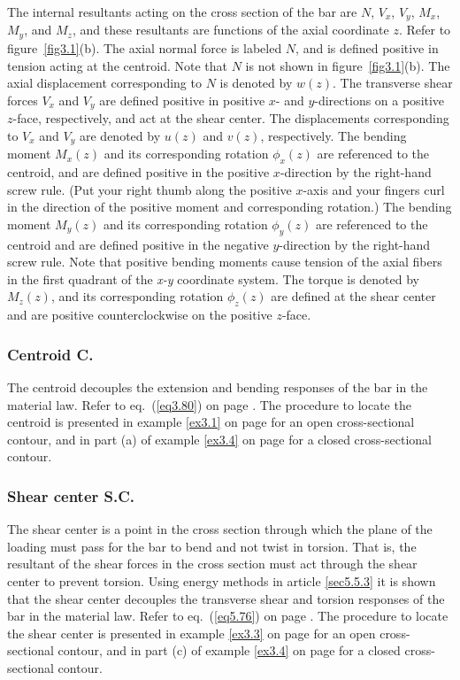 \documentclass{AeroStructure-ERJohnson}
\begin{document}
The internal resultants acting on the cross section of the bar are $N$, $V_{x}$, $V_{y}$, $M_{x}$, $M_{y}$, and $M_{z}$, and these resultants are functions of the axial coordinate $z$. Refer to figure~\ref{fig3.1}(b). The axial normal force is labeled $N$, and is defined positive in tension acting at the centroid. Note that $N$ is not shown in figure~\ref{fig3.1}(b). The axial displacement corresponding to $N$ is denoted by $w(z)$. The transverse shear forces $V_{x}$ and $V_{y}$ are defined positive in positive $x$- and $y$-directions on a positive $z$-face, respectively, and act at the shear center. The displacements corresponding to $V_x$ and $V_y$ are denoted by $u(z)$ and $v(z)$, respectively. The bending moment $M_{x}(z)$ and its corresponding rotation $\phi_{x}(z)$ are referenced to the centroid, and are defined positive in the positive $x$-direction by the right-hand screw rule. (Put your right thumb along the positive $x$-axis and your fingers curl in the direction of the positive moment and corresponding rotation.) The bending moment $M_{y}(z)$ and its corresponding rotation $\phi_{y}(z)$ are referenced to the centroid and are defined positive in the negative $y$-direction by the right-hand screw rule. Note that positive bending moments cause tension of the axial fibers in the first quadrant of the \textit{x-y} coordinate system. The torque is denoted by $M_{z}(z)$, and its corresponding rotation $\phi_{z}(z)$ are defined at the shear center and are positive counterclockwise on the positive $z$-face.


\subsubsection{Centroid C.} The centroid decouples the extension and bending responses of the bar in the material law. Refer to eq.~(\ref{eq3.80}) on page \pageref{eq3.80}. The procedure to locate the centroid is presented in example \ref{ex3.1} on page \pageref{ex3.1} for an open cross-sectional contour, and in part (a) of example \ref{ex3.4} on page \pageref{ex3.4} for a closed cross-sectional contour.

\subsubsection{Shear center S.C.} The shear center is a point in the cross section through which the plane of the loading must pass for the bar to bend and not twist in torsion. That is, the resultant of the shear forces in the cross section must act through the shear center to prevent torsion. Using energy methods in article \ref{sec5.5.3} it is shown that the shear center decouples the transverse shear and torsion responses of the bar in the material law. Refer to eq.~(\ref{eq5.76}) on page \pageref{eq5.76}. The procedure to locate the shear center is presented in example \ref{ex3.3} on page \pageref{ex3.3} for an open cross-sectional contour, and in part (c) of example \ref{ex3.4} on page \pageref{ex3.4} for a closed cross-sectional contour.
\end{document}
